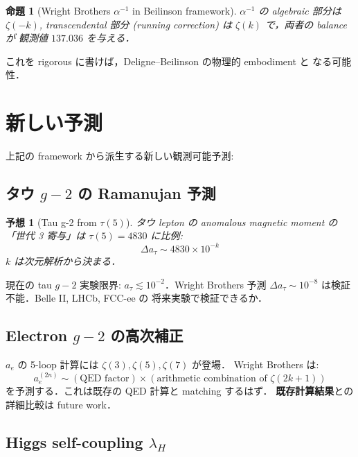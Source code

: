 \documentclass[11pt,a4paper]{article}
\newtheorem{conjecture}{予想}
\newtheorem{proposition}{命題}
\begin{document}
\begin{proposition}[Wright Brothers $\alpha^{-1}$ in Beilinson framework]
$\alpha^{-1}$ の algebraic 部分は $\zeta(-k)$, transcendental 部分
(running correction) は $\zeta(k)$ で，両者の balance が
観測値 $137.036$ を与える．
\end{proposition}

これを rigorous に書けば，Deligne--Beilinson の物理的 embodiment と
なる可能性．

\section{新しい予測}

上記の framework から派生する新しい観測可能予測:

\subsection{タウ $g-2$ の Ramanujan 予測}

\begin{conjecture}[Tau g-2 from $\tau(5)$]
タウ lepton の anomalous magnetic moment の「世代 3 寄与」は
$\tau(5) = 4830$ に比例:
\begin{equation}
\Delta a_\tau \sim 4830 \times 10^{-k}
\end{equation}
$k$ は次元解析から決まる．
\end{conjecture}

現在の tau $g-2$ 実験限界: $a_\tau \lesssim 10^{-2}$．Wright Brothers
予測 $\Delta a_\tau \sim 10^{-8}$ は検証不能．Belle II, LHCb, FCC-ee の
将来実験で検証できるか．

\subsection{Electron $g-2$ の高次補正}

$a_e$ の 5-loop 計算には $\zeta(3), \zeta(5), \zeta(7)$ が登場．
Wright Brothers は:
\begin{equation}
a_e^{(2n)} \sim (\text{QED factor}) \times (\text{arithmetic combination of } \zeta(2k+1))
\end{equation}
を予測する．これは既存の QED 計算と matching するはず．
\textbf{既存計算結果}との詳細比較は future work．

\subsection{Higgs self-coupling $\lambda_H$}
\end{document}
